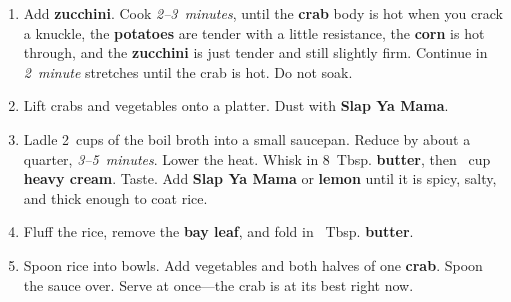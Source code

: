 \documentclass[11pt,letterpaper]{article}
\begin{document}
\begin{enumerate}
    \item Add \textbf{zucchini}. Cook \textit{2--3~minutes}, until the \textbf{crab} body is hot when you crack a knuckle, the \textbf{potatoes} are tender with a little resistance, the \textbf{corn} is hot through, and the \textbf{zucchini} is just tender and still slightly firm. Continue in \textit{2~minute} stretches until the crab is hot. Do not soak.

    \item Lift crabs and vegetables onto a platter. Dust with \textbf{Slap Ya Mama}.

    \item Ladle 2~cups of the boil broth into a small saucepan. Reduce by about a quarter, \textit{3--5~minutes}. Lower the heat. Whisk in 8~Tbsp. \textbf{butter}, then ~cup \textbf{heavy cream}. Taste. Add \textbf{Slap Ya Mama} or \textbf{lemon} until it is spicy, salty, and thick enough to coat rice.

    \item Fluff the rice, remove the \textbf{bay leaf}, and fold in ~Tbsp. \textbf{butter}.

    \item Spoon rice into bowls. Add vegetables and both halves of one \textbf{crab}. Spoon the sauce over. Serve at once---the crab is at its best right now.
\end{enumerate}
\end{document}
